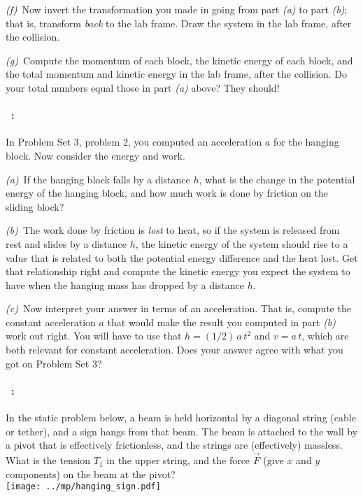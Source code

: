\documentclass[12pt]{article}
\begin{document}
\textsl{(f)}~Now invert the transformation you made in going from part
\textsl{(a)} to part \textsl{(b)}; that is, transform \emph{back} to
the lab frame. Draw the system in the lab frame, after the collision.

\textsl{(g)}~Compute the momentum of each block, the kinetic energy of
each block, and the total momentum and kinetic energy in the lab
frame, after the collision. Do your total numbers equal those in part
\textsl{(a)} above? They should!

\paragraph{\problemname~\theproblem:}\label{blocks}%
In Problem Set 3, problem 2, you computed an acceleration $a$ for the
hanging block. Now consider the energy and work.

\textsl{(a)}~If the hanging block falls by a distance $h$, what is
the change in the potential energy of the hanging block, and how much
work is done by friction on the sliding block?

\textsl{(b)}~The work done by friction is \emph{lost} to heat, so if
the system is released from rest and slides by a distance $h$, the
kinetic energy of the system should rise to a value that is related to both the
potential energy difference and the heat lost. Get that relationship
right and compute the kinetic energy you expect the system to have
when the hanging mass has dropped by a distance $h$.

\textsl{(c)}~Now interpret your answer in terms of an acceleration.
That is, compute the constant acceleration $a$ that would make the
result you computed in part \textsl{(b)} work out right. You will have
to use that $h = (1/2)\,a\,t^2$ and $v=a\,t$, which are both relevant
for constant acceleration. Does your answer agree with what you got on
Problem Set 3?

\paragraph{\problemname~\theproblem:}%
In the static problem below, a beam is held horizontal by a diagonal
string (cable or tether), and a sign hangs from that beam. The beam is
attached to the wall by a pivot that is effectively frictionless, and
the strings are (effectively) massless. What is the tension $T_1$ in
the upper string, and the force $\vec{F}$ (give $x$ and $y$
components) on the beam at the pivot?
\\ \texttt{[image: ../mp/hanging\_sign.pdf]}
\end{document}
